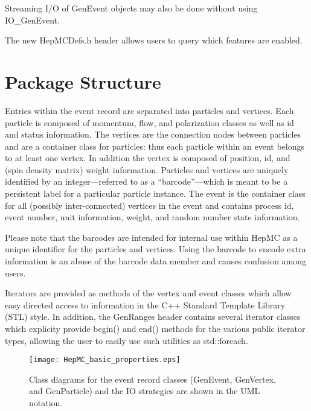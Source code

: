 \documentclass[11pt,letterpaper]{article}
\begin{document}
Streaming I/O of GenEvent objects may also be done without using IO\_GenEvent.

The new HepMCDefs.h header allows users to query which features are 
enabled.

%
%

\section{Package Structure}

Entries within the event record are separated into particles and
vertices. Each particle is composed of momentum, flow, and
polarization classes as well as id and status information. 
The vertices are the connection nodes
between particles and are a container class for particles: thus each
particle within an event belongs to at least one vertex. In addition
the vertex is composed of position, id, and (spin density matrix) 
weight information. Particles and vertices are uniquely identified by
an integer---referred to as a ``barcode''---which is meant to be a
persistent label for a particular particle instance.
The event is the container class for all (possibly
inter-connected) vertices in the event and contains process id, event
number, unit information, weight, and random number state information.

Please note that the barcodes are intended for internal use within HepMC 
as a unique identifier for the particles and vertices.
Using the barcode to encode extra information is an abuse of 
the barcode data member and causes confusion among users. 

Iterators are provided as methods of the vertex and event classes
which allow easy directed access to information in the C++ Standard
Template Library (STL) style.   
In addition, the GenRanges header contains several iterator 
classes which explicity provide begin() and end() methods for the various
public iterator types, allowing the user to easily use such utilities as
std::foreach.

\begin{figure}[!ht]
  \begin{center}
    \texttt{[image: HepMC\_basic\_properties.eps]}
  \end{center}
  \caption[HepMC class diagrams]
    {\label{UML_diagrams} Class diagrams for the event record
    classes (GenEvent, GenVertex, and GenParticle) and the IO strategies
    are shown in the UML notation.}
\end{figure}
\clearpage
\end{document}

